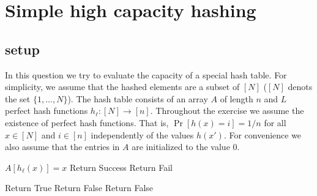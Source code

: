 \section{Simple high capacity hashing}
\subsection*{setup}
In this question we try to evaluate the capacity of a special hash table.
For simplicity, we assume that the hashed elements are a subset of $[N]$ ($[N]$ denots the set $\{1,\dots,N\}$).
The hash table consists of an array $A$ of length $n$ and $L$ perfect hash functions $h_\ell: [N] \rightarrow [n]$.
Throughout the exercise we assume the existence of perfect hash functions. That is, $\Pr[h(x) = i] = 1/n$ for all $x \in [N]$ and $i\in [n]$ 
independently of the values $h(x')$.  For convenience we also assume that the entries in $A$ are initialized to the value $0$.
%
\begin{algorithm}
\caption{$Add(x)$}
\begin{algorithmic}
\FOR {$\ell \in [L]$}
    	\STATE $A[h_\ell(x)] = x$
	\STATE Return Success
    \ENDIF
\ENDFOR
\STATE Return Fail
\end{algorithmic}
\end{algorithm}
%
\vspace{-.6cm}
\begin{algorithm}
\caption{$Query(x)$}
\begin{algorithmic}
\FOR {$\ell \in [L]$}
	\STATE Return True
   	\STATE Return False
    \ENDIF
\ENDFOR
\STATE Return False
\end{algorithmic}
\end{algorithm}
%
\vspace{-.6cm}
